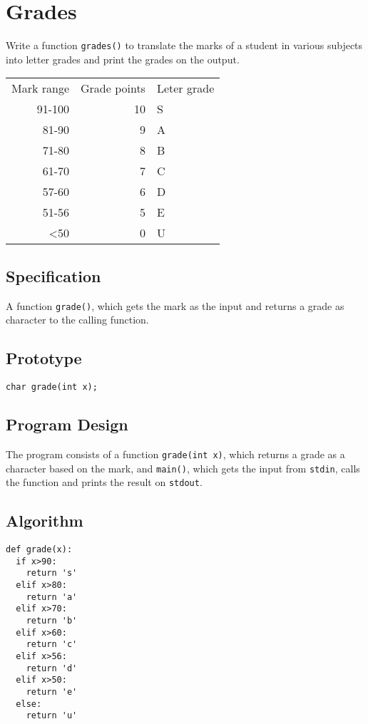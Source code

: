 \documentclass[11pt]{article}
\begin{document}
\section{Grades}
\label{sec-5}
Write a function \texttt{grades()} to translate the marks of a student in various subjects 
into letter grades and print the grades on the output.
\begin{center}
\begin{tabular}{rrl}
Mark range & Grade points & Leter grade\\
91-100 & 10 & S\\
81-90 & 9 & A\\
71-80 & 8 & B\\
61-70 & 7 & C\\
57-60 & 6 & D\\
51-56 & 5 & E\\
<50 & 0 & U\\
\end{tabular}
\end{center}
\subsection*{Specification}
\label{sec-5-1}
A function \texttt{grade()}, which gets the mark as the input and returns a grade as 
character to the calling function.
\subsection*{Prototype}
\label{sec-5-2}
\begin{verbatim}
char grade(int x);
\end{verbatim}
\subsection*{Program Design}
\label{sec-5-3}
The program consists of a function \texttt{grade(int x)}, which returns a grade as a 
character based on the mark, and \texttt{main()}, which gets the input from \texttt{stdin},
calls the function and prints the result on \texttt{stdout}.
\subsection*{Algorithm}
\label{sec-5-4}
\begin{verbatim}
def grade(x):
  if x>90:
    return 's'
  elif x>80:
    return 'a'
  elif x>70:
    return 'b'
  elif x>60:
    return 'c'
  elif x>56:
    return 'd'
  elif x>50:
    return 'e'
  else:
    return 'u'
\end{verbatim}
\end{document}
